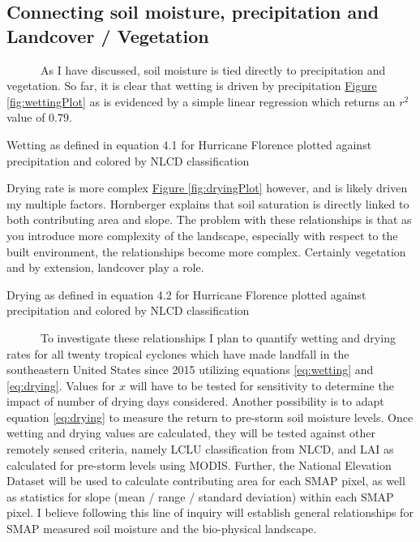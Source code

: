 \documentclass[
]{book}
\begin{document}
\hypertarget{connecting-soil-moisture-precipitation-and-landcover-vegetation}{%
\subsection{Connecting soil moisture, precipitation and Landcover / Vegetation}\label{connecting-soil-moisture-precipitation-and-landcover-vegetation}}

~~~~~~As I have discussed, soil moisture is tied directly to precipitation and vegetation. So far, it is clear that wetting is driven by precipitation \protect\hyperlink{fig:wettingPlot}{Figure \ref{fig:wettingPlot}} as is evidenced by a simple linear regression which returns an \(r^{2}\) value of \(0.79\).

\hypertarget{htmlwidget-44c0ff79ebaf0aa2be7b}{}

\label{fig:wettingPlot}Wetting as defined in equation 4.1 for Hurricane Florence plotted against precipitation and colored by NLCD classification

Drying rate is more complex \protect\hyperlink{fig:dryingPlot}{Figure \ref{fig:dryingPlot}} however, and is likely driven my multiple factors. Hornberger \citet{hornberger2014elements} explains that soil saturation is directly linked to both contributing area and slope. The problem with these relationships is that as you introduce more complexity of the landscape, especially with respect to the built environment, the relationships become more complex. Certainly vegetation and by extension, landcover play a role.

\hypertarget{htmlwidget-25ff702423bacea4f569}{}

\label{fig:dryingPlot}Drying as defined in equation 4.2 for Hurricane Florence plotted against precipitation and colored by NLCD classification

~~~~~~To investigate these relationships I plan to quantify wetting and drying rates for all twenty tropical cyclones which have made landfall in the southeastern United States since 2015 utilizing equations \eqref{eq:wetting} and \eqref{eq:drying}. Values for \(x\) will have to be tested for sensitivity to determine the impact of number of drying days considered. Another possibility is to adapt equation \eqref{eq:drying} to measure the return to pre-storm soil moisture levels. Once wetting and drying values are calculated, they will be tested against other remotely sensed criteria, namely LCLU classification from NLCD, and LAI as calculated for pre-storm levels using MODIS. Further, the National Elevation Dataset will be used to calculate contributing area for each SMAP pixel, as well as statistics for slope (mean / range / standard deviation) within each SMAP pixel. I believe following this line of inquiry will establish general relationships for SMAP measured soil moisture and the bio-physical landscape.
\end{document}
